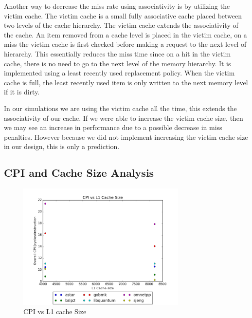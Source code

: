 \documentclass{article}
\begin{document}
Another way to decrease the miss rate using associativity is by utilizing the victim cache. The victim cache is a small fully associative cache placed between two levels of the cache hierarchy. The victim cache extends the associativity of the cache. An item removed from a cache level is placed in the victim cache, on a miss the victim cache is first checked before making a request to the next level of hierarchy. This essentially reduces the miss time since on a hit in the victim cache, there is no need to go to the next level of the memory hierarchy. It is implemented using a least recently used replacement policy. When the victim cache is full, the least recently used item is only written to the next memory level if it is dirty. 

In our simulations we are using the victim cache all the time, this extends the associativity of our cache. If we were able to increase the victim cache size, then we may see an increase in performance due to a possible decrease in miss penalties. However because we did not implement increasing the victim cache size in our design, this is only a prediction. 

\subsection{CPI and Cache Size Analysis}

\begin{figure}[ht]
    \centering
    \includegraphics[width=0.75\textwidth]{plots/CPI_vs_L1cache_size.png}
    \caption{CPI vs L1 cache Size}
    \label{fig:cpivsl1size}
\end{figure}
\end{document}
